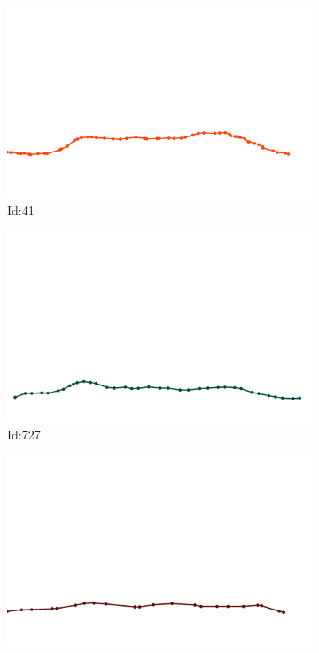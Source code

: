 \documentclass[12pt,twoside]{report}
\begin{document}
\begin{figure}
\centering
\begin{subfigure}[b]{0.20\textwidth}
\centering
\includegraphics[width=\textwidth]{../../trajectories/41.png}
\caption{Id:41}
\end{subfigure}
\begin{subfigure}[b]{0.20\textwidth}
\centering
\includegraphics[width=\textwidth]{../../trajectories/727.png}
\caption{Id:727}
\end{subfigure}
\begin{subfigure}[b]{0.20\textwidth}
\centering
\includegraphics[width=\textwidth]{../../trajectories/841.png}

\end{subfigure}
\end{figure}
\end{document}
